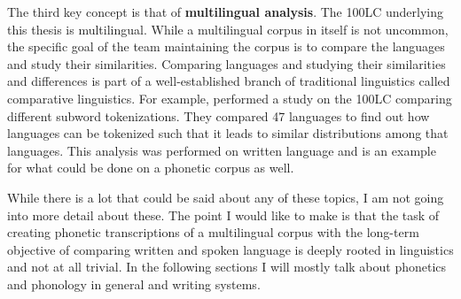 The third key concept is that of \textbf{multilingual analysis}. The 100LC underlying this thesis is multilingual. While a multilingual corpus in itself is not uncommon, the specific goal of the team maintaining the corpus is to compare the languages and study their similarities. Comparing languages and studying their similarities and differences is part of a well-established branch of traditional linguistics called comparative linguistics. For example, \citet{gutierrez-vasques-etal-2021-characters} performed a study on the 100LC comparing different subword tokenizations. They compared 47 languages to find out how languages can be tokenized such that it leads to similar distributions among that languages. This analysis was performed on written language and is an example for what could be done on a phonetic corpus as well.

While there is a lot that could be said about any of these topics, I am not going into more detail about these. The point I would like to make is that the task of creating phonetic transcriptions of a multilingual corpus with the long-term objective of comparing written and spoken language is deeply rooted in linguistics and not at all trivial. In the following sections I will mostly talk about phonetics and phonology in general and writing systems.

